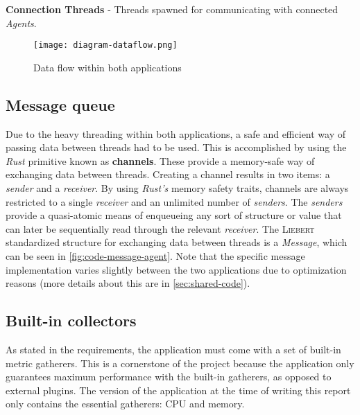         \textbf{Connection Threads} - Threads spawned for communicating with connected \textit{Agents}.
    
        \begin{figure}[!htb]
            \centering
            \texttt{[image: diagram-dataflow.png]}
            \caption{Data flow within both applications}
            \label{fig:diagram-dataflow}
        \end{figure}
    
    \subsection{Message queue}\label{sec:message-queue}
        Due to the heavy threading within both applications, a safe and efficient way of passing data between threads had to be used. This is accomplished by using the \textit{Rust} primitive known as \textbf{channels}. These provide a memory-safe way of exchanging data between threads. Creating a channel results in two items: a \textit{sender} and a \textit{receiver}. By using \textit{Rust's} memory safety traits, channels are always restricted to a single \textit{receiver} and an unlimited number of \textit{senders}. The \textit{senders} provide a quasi-atomic means of enqueueing any sort of structure or value that can later be sequentially read through the relevant \textit{receiver}. The \textsc{Liebert} standardized structure for exchanging data between threads is a \textit{Message}, which can be seen in \autoref{fig:code-message-agent}. Note that the specific message implementation varies slightly between the two applications due to optimization reasons (more details about this are in \autoref{sec:shared-code}).
    
    \subsection{Built-in collectors}
        As stated in the requirements, the application must come with a set of built-in metric gatherers. This is a cornerstone of the project because the application only guarantees maximum performance with the built-in gatherers, as opposed to external plugins. The version of the application at the time of writing this report only contains the essential gatherers: CPU and memory.
    

